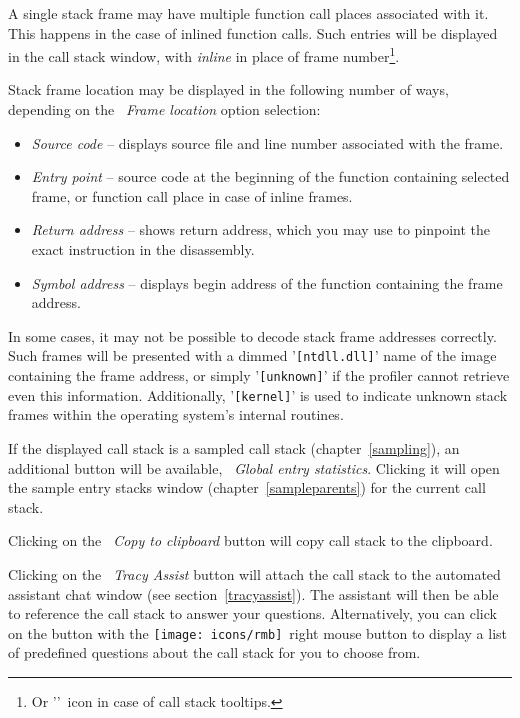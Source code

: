 \documentclass[hidelinks,titlepage,a4paper,twoside]{article}
\newcommand{\RMB}{\texttt{[image: icons/rmb]}}
\begin{document}
A single stack frame may have multiple function call places associated with it. This happens in the case of inlined function calls. Such entries will be displayed in the call stack window, with \emph{inline} in place of frame number\footnote{Or '\faCaretRight{}'~icon in case of call stack tooltips.}.

Stack frame location may be displayed in the following number of ways, depending on the \emph{\faAt{}~Frame location} option selection:

\begin{itemize}
\item \emph{Source code} -- displays source file and line number associated with the frame.
\item \emph{Entry point} -- source code at the beginning of the function containing selected frame, or function call place in case of inline frames.
\item \emph{Return address} -- shows return address, which you may use to pinpoint the exact instruction in the disassembly.
\item \emph{Symbol address} -- displays begin address of the function containing the frame address.
\end{itemize}

In some cases, it may not be possible to decode stack frame addresses correctly. Such frames will be presented with a dimmed '\texttt{[ntdll.dll]}' name of the image containing the frame address, or simply '\texttt{[unknown]}' if the profiler cannot retrieve even this information. Additionally, '\texttt{[kernel]}' is used to indicate unknown stack frames within the operating system's internal routines.

If the displayed call stack is a sampled call stack (chapter~\ref{sampling}), an additional button will be available, \emph{\faDoorOpen{}~Global entry statistics}. Clicking it will open the sample entry stacks window (chapter~\ref{sampleparents}) for the current call stack.

Clicking on the \emph{\faClipboard{}~Copy to clipboard} button will copy call stack to the clipboard.

Clicking on the \emph{\faRobot{}~Tracy Assist} button will attach the call stack to the automated assistant chat window (see section~\ref{tracyassist}). The assistant will then be able to reference the call stack to answer your questions. Alternatively, you can click on the button with the \RMB{}~right mouse button to display a list of predefined questions about the call stack for you to choose from.
\end{document}
